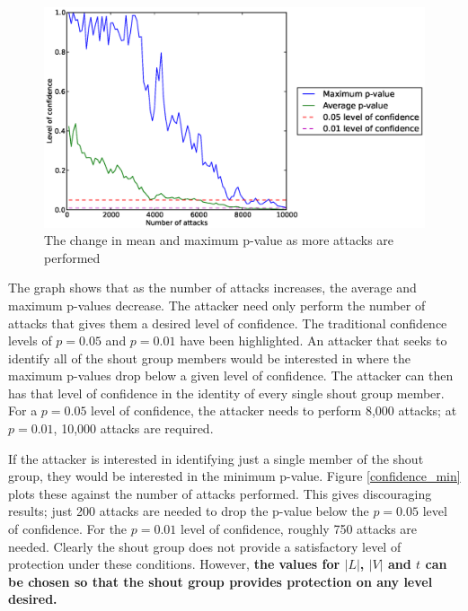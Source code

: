 \documentclass[ %
                    author={Luke Murray},
                supervisor={Dr. Simon Hollis},
                     title={Shadow Peer-to-Peer Networks},
                  subtitle={},
                    degree={MEng},
                      year={2013} ]{thesis}
\begin{document}
\begin{figure}[h]
    \centering
    \begin{minipage}[b]{0.9\linewidth}
        \centering
        \includegraphics[width=\linewidth]{diagrams/confidence.eps}
        \caption{The change in mean and maximum p-value as more attacks are performed}
    \end{minipage}
    \label{confidence}
\end{figure}

The graph shows that as the number of attacks increases, the average and maximum p-values decrease. The attacker need only perform the number of attacks that gives them a desired level of confidence. The traditional confidence levels of $p = 0.05$ and $p = 0.01$ have been highlighted. An attacker that seeks to identify all of the shout group members would be interested in where the maximum p-values drop below a given level of confidence. The attacker can then has that level of confidence in the identity of every single shout group member. For a $p = 0.05$ level of confidence, the attacker needs to perform 8,000 attacks; at $p = 0.01$, 10,000 attacks are required.

If the attacker is interested in identifying just a single member of the shout group, they would be interested in the minimum p-value. Figure \ref{confidence_min} plots these against the number of attacks performed. This gives discouraging results; just 200 attacks are needed to drop the p-value below the $p = 0.05$ level of confidence. For the $p = 0.01$ level of confidence, roughly 750 attacks are needed. Clearly the shout group does not provide a satisfactory level of protection under these conditions. However, \textbf{the values for $|L|$, $|V|$ and $t$ can be chosen so that the shout group provides protection on any level desired.}
\end{document}
